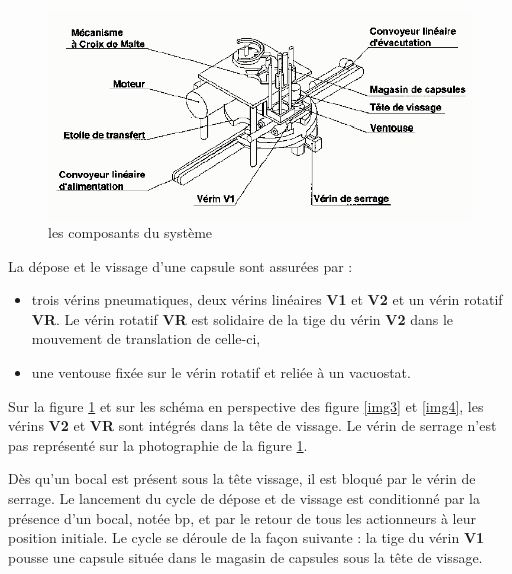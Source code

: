 \begin{figure}
  \centering\includegraphics[width=0.9\linewidth]{img/Global_indexa.png}
    \caption{les composants du système}
  \label{img2}
\end{figure}

La dépose et le vissage d'une capsule sont assurées par : 
\begin{itemize}
 \item trois vérins pneumatiques, deux vérins linéaires \textbf{V1} et \textbf{V2} et un vérin rotatif \textbf{VR}. Le vérin rotatif \textbf{VR} est solidaire de la tige du vérin \textbf{V2} dans le mouvement de translation de celle-ci,
 \item une ventouse fixée sur le vérin rotatif et reliée à un vacuostat.
\end{itemize}


Sur la figure \ref{img2} et sur les schéma en perspective des figure \ref{img3} et \ref{img4}, les vérins \textbf{V2} et \textbf{VR} sont intégrés dans la tête de vissage. Le vérin de serrage n'est pas représenté sur la photographie de la figure \ref{img2}. 

Dès qu'un bocal est présent sous la tête vissage, il est bloqué par le vérin de serrage. Le lancement du cycle de dépose et de vissage est conditionné par la présence d'un bocal, notée bp, et par le retour de tous les actionneurs à leur position initiale. Le cycle se déroule de la façon suivante : la tige du vérin \textbf{V1} pousse une capsule située dans le magasin de capsules sous la tête de vissage.

